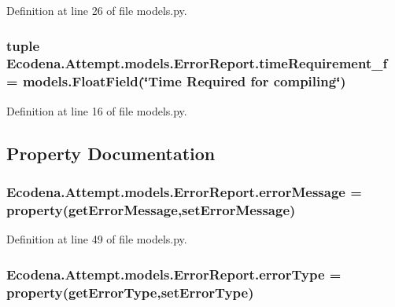 Definition at line 26 of file models.py.

\hypertarget{class_ecodena_1_1_attempt_1_1models_1_1_error_report_aafea830ed4b75d8af62b447a58a23fdb}{
\subsubsection[{timeRequirement\_\-f}]{\setlength{\rightskip}{0pt plus 5cm}tuple {\bf Ecodena.Attempt.models.ErrorReport.timeRequirement\_\-f} = models.FloatField(\char`\"{}Time Required for compiling\char`\"{})}}
\label{df/d02/class_ecodena_1_1_attempt_1_1models_1_1_error_report_aafea830ed4b75d8af62b447a58a23fdb}


Definition at line 16 of file models.py.



\subsection{Property Documentation}
\hypertarget{class_ecodena_1_1_attempt_1_1models_1_1_error_report_a56aeca1efa6009ebf80c53d118e4f5eb}{
\subsubsection[{errorMessage}]{\setlength{\rightskip}{0pt plus 5cm}Ecodena.Attempt.models.ErrorReport.errorMessage = property(getErrorMessage,setErrorMessage)}}
\label{df/d02/class_ecodena_1_1_attempt_1_1models_1_1_error_report_a56aeca1efa6009ebf80c53d118e4f5eb}


Definition at line 49 of file models.py.

\hypertarget{class_ecodena_1_1_attempt_1_1models_1_1_error_report_a76dd2e9f06b5ba04cf47e088bc4b47b4}{
\subsubsection[{errorType}]{\setlength{\rightskip}{0pt plus 5cm}Ecodena.Attempt.models.ErrorReport.errorType = property(getErrorType,setErrorType)}}
\label{df/d02/class_ecodena_1_1_attempt_1_1models_1_1_error_report_a76dd2e9f06b5ba04cf47e088bc4b47b4}


